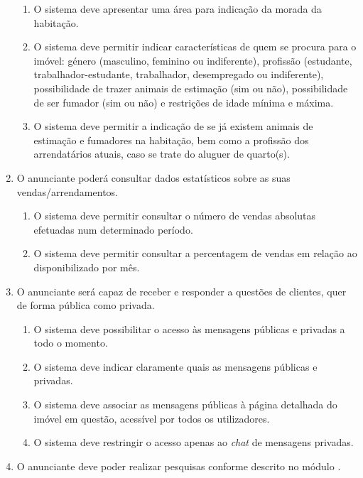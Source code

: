 \begin{enumerate}
\begin{enumerate}
        \item O sistema deve apresentar uma área para indicação da morada da habitação.
        \item O sistema deve permitir indicar características de quem se procura para o imóvel: género (masculino, feminino ou indiferente), profissão (estudante, trabalhador-estudante, trabalhador, desempregado ou indiferente), possibilidade de trazer animais de estimação (sim ou não), possibilidade de ser fumador (sim ou não) e restrições de idade mínima e máxima.
        \item O sistema deve permitir a indicação de se já existem animais de estimação e fumadores na habitação, bem como a profissão dos arrendatários atuais, caso se trate do aluguer de quarto(s).
    \end{enumerate}

    \item O anunciante poderá consultar dados estatísticos sobre as suas vendas/arrendamentos.
    \begin{enumerate}
        \item O sistema deve permitir consultar o número de vendas absolutas efetuadas num determinado período.
        \item O sistema deve permitir consultar a percentagem de vendas em relação ao disponibilizado por mês.
    \end{enumerate}

    \item O anunciante será capaz de receber e responder a questões de clientes, quer de forma pública como privada.
    \begin{enumerate}
        \item O sistema deve possibilitar o acesso às mensagens públicas e privadas a todo o momento.
        \item O sistema deve indicar claramente quais as mensagens públicas e privadas.
        \item O sistema deve associar as mensagens públicas à página detalhada do imóvel em questão, acessível por todos os utilizadores.
        \item O sistema deve restringir o acesso apenas ao \textit{chat} de mensagens privadas.
    \end{enumerate}
    \item O anunciante deve poder realizar pesquisas conforme descrito no módulo .
\end{enumerate}

